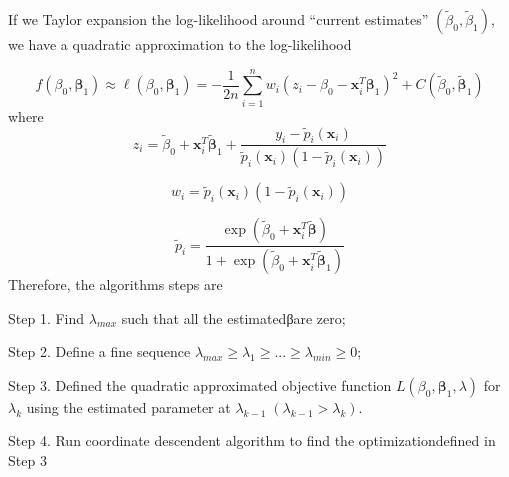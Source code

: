 \documentclass[]{article}
\begin{document}
If we Taylor expansion the log-likelihood around ``current estimates''
\(\left(\widetilde{\beta}_{0}, \tilde{\beta}_{1}\right)\), we have a
quadratic approximation to the log-likelihood

\[
f\left(\beta_{0}, \boldsymbol{\beta}_{1}\right) \approx \ell\left(\beta_{0}, \boldsymbol{\beta}_{1}\right)=-\frac{1}{2 n} \sum_{i=1}^{n} w_{i}\left(z_{i}-\beta_{0}-\mathbf{x}_{i}^{T} \boldsymbol{\beta}_{1}\right)^{2}+C\left(\widetilde{\beta}_{0}, \widetilde{\boldsymbol{\beta}}_{1}\right)
\] where \[
z_{i}=\widetilde{\beta}_{0}+\mathbf{x}_{i}^{T} \widetilde{\boldsymbol{\beta}}_{1}+\frac{y_{i}-\widetilde{p}_{i}\left(\mathbf{x}_{i}\right)}{\widetilde{p}_{i}\left(\mathbf{x}_{i}\right)\left(1-\widetilde{p}_{i}\left(\mathbf{x}_{i}\right)\right)}
\]

\[
w_{i}=\widetilde{p}_{i}\left(\mathbf{x}_{i}\right)\left(1-\widetilde{p}_{i}\left(\mathbf{x}_{i}\right)\right)
\]

\[
\widetilde{p}_{i}=\frac{\exp \left(\widetilde{\beta}_{0}+\mathbf{x}_{i}^{T} \widetilde{\boldsymbol{\beta}}\right)}{1+\exp \left(\widetilde{\beta}_{0}+\mathbf{x}_{i}^{T} \widetilde{\boldsymbol{\beta}}_{1}\right)}
\] Therefore, the algorithms steps are

Step 1. Find \(\lambda_{max}\) such that all the estimatedβare zero;

Step 2. Define a fine sequence
\(\lambda_{max}\ge\lambda_1\ge...\ge\lambda_{min}\ge0\);

Step 3. Defined the quadratic approximated objective function
\(L\left(\beta_{0}, \boldsymbol{\beta}_{1}, \lambda\right)\) for
\(\lambda_k\) using the estimated parameter at
\(\lambda_{k-1}\;\left(\lambda_{k-1}>\lambda_{k}\right)\).

Step 4. Run coordinate descendent algorithm to find the
optimizationdefined in Step 3
\end{document}
